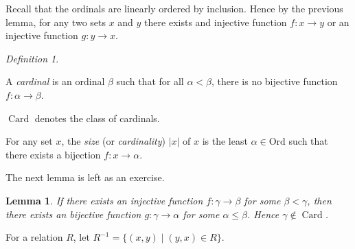 \documentclass[a4paper, 11pt]{amsart}
\newtheorem{lemma}[lemma]{Lemma}
\theoremstyle{remark}
\newtheorem{definition}[definition]{Definition}
\newcommand{\Ord}{\mathrm{Ord}}
\newcommand{\ran}{\mathrm{ran}}
\DeclareMathOperator{\Card}{Card}
\newenvironment{enumerate-(1)}{\begin{enumerate}[label={\upshape (\arabic*)}, leftmargin=2pc]}{\end{enumerate}}
\begin{document}
Recall that the ordinals are linearly ordered by inclusion. 
Hence by the previous lemma, for any two sets $x$ and $y$ there exists and injective function $f\colon x\rightarrow y$ or an injective function $g\colon y\rightarrow x$. 

\begin{definition} \ 
\begin{enumerate-(1)} 
\item 
A \emph{cardinal} is an ordinal $\beta$ such that for all $\alpha<\beta$, there is no bijective function $f\colon \alpha \rightarrow \beta$. 
\item 
$\Card$ denotes the class of cardinals. 
\item 
For any set $x$, the \emph{size} (or \emph{cardinality}) $|x|$ of $x$ is the least $\alpha\in \Ord$ such that there exists a bijection $f\colon x \rightarrow \alpha$. 
\end{enumerate-(1)} 
\end{definition} 

The next lemma is left as an exercise. 

\begin{lemma} 
If there exists an injective function $f\colon \gamma\rightarrow \beta$ for some $\beta<\gamma$, then there exists an bijective function $g\colon \gamma\rightarrow \alpha$ for some $\alpha\leq\beta$. 
Hence $\gamma\notin \Card$. 
\end{lemma} 


For a relation $R$, let $R^{-1}=\{(x,y)\mid (y,x)\in R \}$. 
\end{document}
